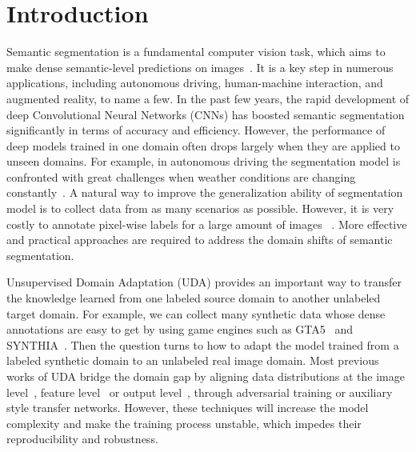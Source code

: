 \documentclass[10pt,twocolumn,letterpaper]{article}
\begin{document}
\section{Introduction}
	Semantic segmentation is a fundamental computer vision task, which aims to make dense semantic-level predictions on images~\cite{long2015fully,zhao2017pyramid,chen2017deeplab,lin2017refinenet,wang2021exploring}. It is a key step in numerous applications, including autonomous driving, human-machine interaction, and augmented reality, to name a few. In the past few years, the rapid development of deep Convolutional Neural Networks (CNNs) has boosted semantic segmentation significantly in terms of accuracy and efficiency. However, the performance of deep models trained in one domain often drops largely when they are applied to unseen domains. For example, in autonomous driving the segmentation model is confronted with great challenges when weather conditions are changing constantly~\cite{zou2018unsupervised}. A natural way to improve the generalization ability of segmentation model is to collect data from as many scenarios as possible. However, it is very costly to annotate pixel-wise labels for a large amount of images ~\cite{cordts2016cityscapes}. More effective and practical approaches are required to address the domain shifts of semantic segmentation. 
	
	Unsupervised Domain Adaptation (UDA) provides an important way to transfer the knowledge learned from one labeled source domain to another unlabeled target domain. For example, we can collect many synthetic data whose dense annotations are easy to get by using game engines such as GTA5~\cite{richter2016playing} and SYNTHIA~\cite{ros2016synthia}. Then the question turns to how to adapt the model trained from a labeled synthetic domain to an unlabeled real image domain. Most previous works of UDA bridge the domain gap by aligning data distributions at the image level~\cite{hoffman2017cycada,li2019bidirectional,murez2018image}, feature level~\cite{chen2019progressive,hoffman2017cycada,hoffman2016fcns,li2021t} or output level~\cite{melas2021pixmatch,luo2019taking,tsai2018learning}, through adversarial training or auxiliary style transfer networks. However, these techniques will increase the model complexity and make the training process unstable, which impedes their reproducibility and robustness. 
	
\end{document}
